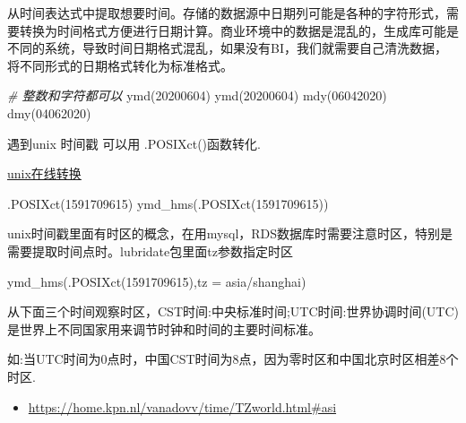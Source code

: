 \documentclass[
]{book}
\newenvironment{Shaded}{\begin{snugshade}}{\end{snugshade}}
\newcommand{\AttributeTok}[1]{\textcolor[rgb]{0.77,0.63,0.00}{#1}}
\newcommand{\CommentTok}[1]{\textcolor[rgb]{0.56,0.35,0.01}{\textit{#1}}}
\newcommand{\DecValTok}[1]{\textcolor[rgb]{0.00,0.00,0.81}{#1}}
\newcommand{\FunctionTok}[1]{\textcolor[rgb]{0.00,0.00,0.00}{#1}}
\newcommand{\NormalTok}[1]{#1}
\newcommand{\StringTok}[1]{\textcolor[rgb]{0.31,0.60,0.02}{#1}}
\providecommand{\tightlist}{%
  \setlength{\itemsep}{0pt}\setlength{\parskip}{0pt}}
\begin{document}
从时间表达式中提取想要时间。存储的数据源中日期列可能是各种的字符形式，需要转换为时间格式方便进行日期计算。商业环境中的数据是混乱的，生成库可能是不同的系统，导致时间日期格式混乱，如果没有BI，我们就需要自己清洗数据，将不同形式的日期格式转化为标准格式。

\begin{Shaded}
\begin{Highlighting}[]

\CommentTok{\# 整数和字符都可以}
\FunctionTok{ymd}\NormalTok{(}\DecValTok{20200604}\NormalTok{) }
\FunctionTok{ymd}\NormalTok{(}\StringTok{\textquotesingle{}20200604\textquotesingle{}}\NormalTok{)}
\FunctionTok{mdy}\NormalTok{(}\DecValTok{06042020}\NormalTok{)}
\FunctionTok{dmy}\NormalTok{(}\DecValTok{04062020}\NormalTok{)}
\end{Highlighting}
\end{Shaded}

遇到unix 时间戳 可以用 .POSIXct()函数转化.

\href{https://unixtime.51240.com/}{unix在线转换}

\begin{Shaded}
\begin{Highlighting}[]
\FunctionTok{.POSIXct}\NormalTok{(}\DecValTok{1591709615}\NormalTok{)}
\FunctionTok{ymd\_hms}\NormalTok{(}\FunctionTok{.POSIXct}\NormalTok{(}\DecValTok{1591709615}\NormalTok{))}
\end{Highlighting}
\end{Shaded}

unix时间戳里面有时区的概念，在用mysql，RDS数据库时需要注意时区，特别是需要提取时间点时。lubridate包里面tz参数指定时区

\begin{Shaded}
\begin{Highlighting}[]
\FunctionTok{ymd\_hms}\NormalTok{(}\FunctionTok{.POSIXct}\NormalTok{(}\DecValTok{1591709615}\NormalTok{),}\AttributeTok{tz =} \StringTok{\textquotesingle{}asia/shanghai\textquotesingle{}}\NormalTok{)}
\end{Highlighting}
\end{Shaded}

从下面三个时间观察时区，CST时间:中央标准时间;UTC时间:世界协调时间(UTC)是世界上不同国家用来调节时钟和时间的主要时间标准。

如:当UTC时间为0点时，中国CST时间为8点，因为零时区和中国北京时区相差8个时区.

\begin{itemize}
\tightlist
\item
  \url{https://home.kpn.nl/vanadovv/time/TZworld.html\#asi}
\end{itemize}
\end{document}

